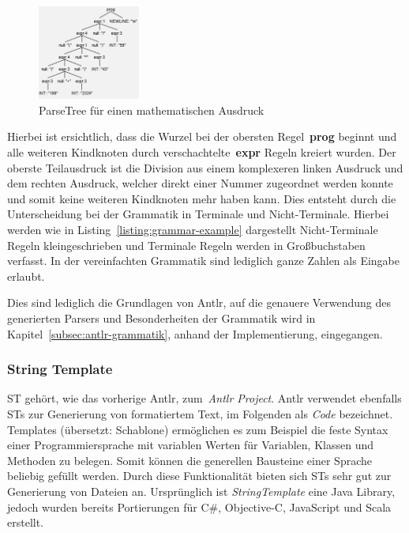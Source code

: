 \begin{figure}[h]
    \centering
    \includegraphics[width=0.3\textwidth]{images/2.2/parseTreeExample}
    \caption{ParseTree für einen mathematischen Ausdruck}
    \label{fig:parse-example}
\end{figure}

Hierbei ist ersichtlich, dass die Wurzel bei der obersten Regel~\textbf{prog} beginnt und alle weiteren Kindknoten durch verschachtelte~\textbf{expr} Regeln kreiert wurden.
Der oberste Teilausdruck ist die Division aus einem komplexeren linken Ausdruck und dem rechten Ausdruck, welcher direkt einer Nummer zugeordnet werden konnte und somit keine weiteren Kindknoten mehr haben kann.
Dies entsteht durch die Unterscheidung bei der Grammatik in Terminale und Nicht-Terminale.
Hierbei werden wie in Listing~\ref{listing:grammar-example} dargestellt Nicht-Terminale Regeln kleingeschrieben und Terminale Regeln werden in Großbuchstaben verfasst.
In der vereinfachten Grammatik sind lediglich ganze Zahlen als Eingabe erlaubt.

Dies sind lediglich die Grundlagen von Antlr, auf die genauere Verwendung des generierten Parsers und Besonderheiten der Grammatik wird in Kapitel~\ref{subsec:antlr-grammatik},
anhand der Implementierung, eingegangen.

\subsubsection{String Template}
\ac{ST} gehört, wie das vorherige \ac{Antlr}, zum~\textit{Antlr Project}.
\ac{Antlr} verwendet ebenfalls \ac{ST}s zur Generierung von formatiertem Text, im Folgenden als \textit{Code} bezeichnet.
Templates (übersetzt: Schablone) ermöglichen es zum Beispiel die feste Syntax einer Programmiersprache mit variablen Werten für
Variablen, Klassen und Methoden zu belegen.
Somit können die generellen Bausteine einer Sprache beliebig gefüllt werden.
Durch diese Funktionalität bieten sich \ac{ST}s sehr gut zur Generierung von Dateien an.
Ursprünglich ist \textit{StringTemplate} eine Java Library, jedoch wurden bereits Portierungen für C\#, Objective-C, JavaScript und Scala erstellt.

